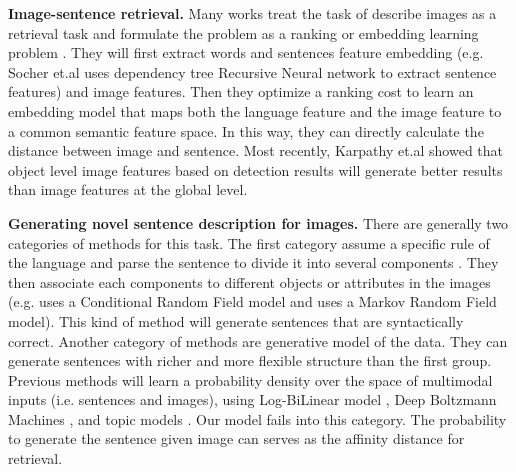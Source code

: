 \textbf{Image-sentence retrieval.}
Many works treat the task of describe images as a retrieval task and formulate the problem as a ranking or embedding learning problem \cite{hodosh2013framing,frome2013devise,socher2014grounded}.
They will first extract words and sentences feature embedding (e.g. Socher et.al \cite{socher2014grounded} uses dependency tree Recursive Neural network to extract sentence features) and image features.
Then they optimize a ranking cost to learn an embedding model that maps both the language feature and the image feature to a common semantic feature space.
In this way, they can directly calculate the distance between image and sentence.
Most recently, Karpathy et.al \cite{karpathy2014fragment} showed that object level image features based on detection results will generate better results than image features at the global level.

\textbf{Generating novel sentence description for images.}
There are generally two categories of methods for this task.
The first category assume a specific rule of the language and parse the sentence to divide it into several components \cite{mitchell2012midge,gupta2012image}.
They then associate each components to different objects or attributes in the images (e.g. \cite{kulkarni2011baby} uses a Conditional Random Field model and \cite{farhadi2010every} uses a Markov Random Field model).
This kind of method will generate sentences that are syntactically correct.
Another category of methods are generative model of the data.
They can generate sentences with richer and more flexible structure than the first group.
Previous methods will learn a probability density over the space of multimodal inputs (i.e. sentences and images), using Log-BiLinear model \cite{kiros2013multimodal}, Deep Boltzmann Machines \cite{srivastava2012multimodal}, and topic models \cite{barnard2003matching,jia2011learning}.
Our model fails into this category.
The probability to generate the sentence given image can serves as the affinity distance for retrieval.